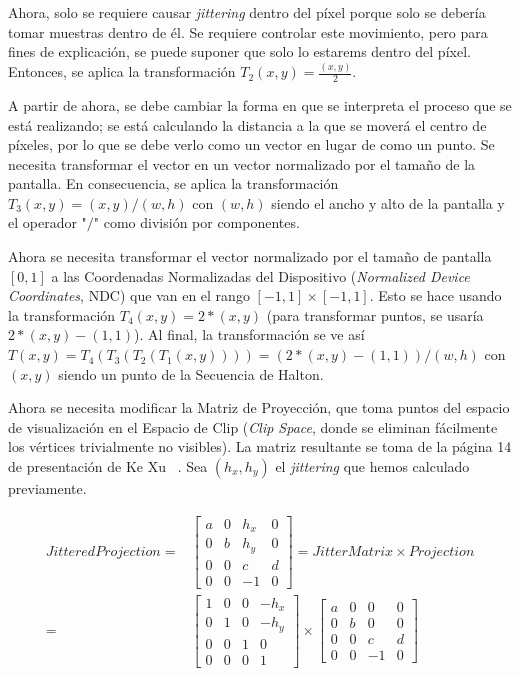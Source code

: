 \documentclass[pregrado]{tesis-usb} %
\begin{document}
Ahora, solo se requiere causar \textit{jittering} dentro del píxel porque solo se debería tomar muestras dentro de él. Se requiere controlar este movimiento, pero para fines de explicación, se puede suponer que solo lo estarems dentro del píxel. Entonces, se aplica la transformación $T_2 (x, y) = \frac{(x, y)}{2}$.

A partir de ahora, se debe cambiar la forma en que se interpreta el proceso que se está realizando; se está calculando la distancia a la que se moverá el centro de píxeles, por lo que se debe verlo como un vector en lugar de como un punto. Se necesita transformar el vector en un vector normalizado por el tamaño de la pantalla. En consecuencia, se aplica la transformación $T_3 (x, y) = (x, y) / (w, h)$ con $(w, h)$ siendo el ancho y alto de la pantalla y el operador "$/$" como división por componentes.

Ahora se necesita transformar el vector normalizado por el tamaño de pantalla $ [0, 1] $ a las Coordenadas Normalizadas del Dispositivo (\textit{Normalized Device Coordinates}, NDC) que van en el rango $ [- 1, 1] \times [-1, 1]$. Esto se hace usando la transformación $T_4 (x, y) = 2 * (x, y)$ (para transformar puntos, se usaría $2 * (x, y) - (1, 1)$). Al final, la transformación se ve así $T (x, y) = T_4 (T_3 (T_2 (T_1 (x, y)))) = (2 * (x, y) - (1, 1)) / (w, h) $ con $ (x, y) $ siendo un punto de la Secuencia de Halton.

Ahora se necesita modificar la Matriz de Proyección, que toma puntos del espacio de visualización en el Espacio de Clip (\textit{Clip Space}, donde se eliminan fácilmente los vértices trivialmente no visibles). La matriz resultante se toma de la página 14 de presentación de Ke Xu ~\cite{XU2016}. Sea $ (h_x, h_y) $ el \textit{jittering} que hemos calculado previamente.

\begin{equation}
\begin{split}
JitteredProjection = & \begin{bmatrix*} 
a & 0 & h_x & 0 \\ 
0 & b & h_y & 0 \\
0 & 0 & c & d   \\
0 & 0 & -1 & 0   \end{bmatrix*} = JitterMatrix\times Projection \\
= & \begin{bmatrix*} 
1 & 0 & 0 & -h_x \\ 
0 & 1 & 0 & -h_y \\
0 & 0 & 1 & 0   \\
0 & 0 & 0 & 1   \end{bmatrix*} \times \begin{bmatrix*} 
a & 0 & 0 & 0 \\ 
0 & b & 0 & 0 \\
0 & 0 & c & d   \\
0 & 0 & -1 & 0   \end{bmatrix*}
\end{split}
\end{equation}
\end{document}
